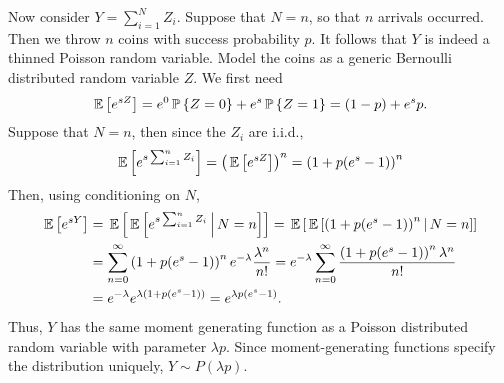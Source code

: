 \begin{question}
\begin{solution}
Now consider $Y=\sum_{i=1}^N Z_i$. Suppose that $N=n$, so that $n$
arrivals occurred. Then we throw $n$ coins with success probability
$p$. It follows that $Y$ is indeed a thinned Poisson random variable.
Model the coins as a generic Bernoulli distributed random variable
$Z$.  We first need
\begin{equation*}
  \,\mathbb{E}\left[e^{s Z}\right] = e^0 \,\mathbb{P}\left\{Z=0\right\} + e^{s} \,\mathbb{P}\left\{Z=1\right\} = (1-p) + e^s p.
\end{equation*}
Suppose that $N=n$, then since the $Z_i$ are i.i.d.,
\begin{equation*}
\,\mathbb{E}\left[e^{s\sum_{i=1}^n Z_i}\right] = \left(\,\mathbb{E}\left[e^{s Z}\right]\right)^n = \left(1 + p (e^s - 1)\right)^n
\end{equation*}
Then, using conditioning on $N$, 
\begin{equation*}
  \begin{split}
  \,\mathbb{E}\left[e^{s Y}\right]
&= \,\mathbb{E}\left[\,\mathbb{E}\left[e^{s\sum_{i=1}^n Z_i} \,\middle|\, N=n \right]\right] 
 = \,\mathbb{E}\left[\,\mathbb{E}\left[\left(1+p(e^s-1)\right)^n \,\middle|\, N=n \right]\right] \\
&= \sum_{n=0}^\infty \left(1+p(e^s-1)\right)^n e^{-\lambda} \frac{\lambda^n}{n!}
= e^{-\lambda} \sum_{n=0}^\infty \frac{\left(1+p(e^s-1)\right)^n \lambda^n}{n!}\\
&= e^{-\lambda} e^{\lambda (1+p(e^s-1))} = e^{\lambda p (e^s - 1)}.
  \end{split}
\end{equation*}
Thus, $Y$ has the same moment generating function as a Poisson
distributed random variable with parameter $\lambda p$. Since
moment-generating functions specify the distribution uniquely,
$Y\sim P(\lambda p)$.

\end{solution}
\end{question}    

